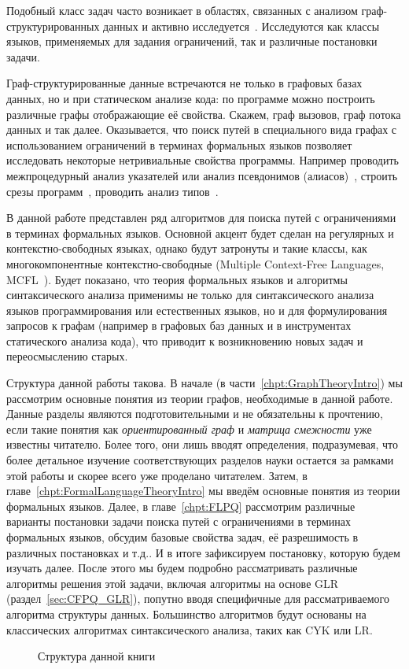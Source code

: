 Подобный класс задач часто возникает в областях, связанных с анализом граф-структурированных данных и активно исследуется~.
Исследуются как классы языков, применяемых для задания ограничений, так и различные постановки задачи.

Граф-структурированные данные встречаются не только в графовых базах данных, но и при статическом анализе кода: по программе можно построить различные графы отображающие её свойства.
Скажем, граф вызовов, граф потока данных и так далее.
Оказывается, что поиск путей в специального вида графах с использованием ограничений в терминах формальных языков позволяет исследовать некоторые нетривиальные свойства программы.
Например проводить межпроцедурный анализ указателей или анализ псевдонимов (алиасов)~, строить срезы программ~, проводить анализ типов~.

В данной работе представлен ряд алгоритмов для поиска путей с ограничениями в терминах формальных языков.
Основной акцент будет сделан на регулярных и контекстно-свободных языках, однако будут затронуты и такие классы, как многокомпонентные контекстно-свободные (Multiple Context-Free Languages, MCFL~).
Будет показано, что теория формальных языков и алгоритмы синтаксического анализа применимы не только для синтаксического анализа языков программирования или естественных языков, но и для формулирования запросов к графам (например в графовых баз данных и в инструментах статического анализа кода), что приводит к возникновению новых задач и переосмыслению старых.

Структура данной работы такова.
В начале (в части~\ref{chpt:GraphTheoryIntro}) мы рассмотрим основные понятия из теории графов, необходимые в данной работе. Данные разделы являются подготовительными и не обязательны к прочтению, если такие понятия как \textit{ориентированный граф} и \textit{матрица смежности} уже известны читателю.
Более того, они лишь вводят определения, подразумевая, что более детальное изучение соответствующих разделов науки остается за рамками этой работы и скорее всего уже проделано читателем.
Затем, в главе~\ref{chpt:FormalLanguageTheoryIntro} мы введём основные понятия из теории формальных языков.
Далее, в главе~\ref{chpt:FLPQ} рассмотрим различные варианты постановки задачи поиска путей с ограничениями в терминах формальных языков, обсудим базовые свойства задач, её разрешимость в различных постановках и т.д..
И в итоге зафиксируем постановку, которую будем изучать далее.
После этого мы будем подробно рассматривать различные алгоритмы решения этой задачи, включая алгоритмы на основе GLR (раздел~\ref{sec:CFPQ_GLR}), попутно вводя специфичные для рассматриваемого алгоритма структуры данных.
Большинство алгоритмов будут основаны на классических алгоритмах синтаксического анализа, таких как CYK или LR.

\begin{figure}
    \caption{Структура данной книги}
    \begin{center}
        
    \end{center}
\end{figure}

